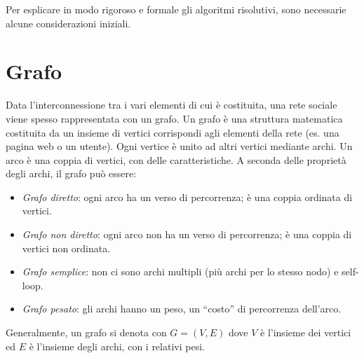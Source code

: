     Per esplicare in modo rigoroso e formale gli algoritmi risolutivi,
    sono necessarie alcune considerazioni iniziali.
    \section{Grafo}
    Data l'interconnessione tra i vari elementi di cui è costituita, una rete sociale viene spesso rappresentata con un grafo.
    Un grafo è una struttura matematica costituita da un insieme di vertici corrispondi agli elementi della rete (es. una pagina web o un utente). 
    Ogni vertice è unito ad altri vertici mediante archi. Un arco è una coppia di vertici, con delle caratteristiche. 
    A seconda delle proprietà degli archi, il grafo può essere:
    \begin{itemize}
        \item \emph{Grafo diretto}: ogni arco ha un verso di percorrenza; è una coppia ordinata di vertici.
        \item \emph{Grafo non diretto}: ogni arco non ha un verso di percorrenza; è una coppia di vertici non ordinata.
        \item \emph{Grafo semplice}: non ci sono archi multipli (più archi per lo stesso nodo) e self-loop.
        \item \emph{Grafo pesato}: gli archi hanno un peso, un ``costo'' di percorrenza dell'arco.
    \end{itemize}
    Generalmente, un grafo si denota con $G=(V,E)$ dove $V$ 
    è l'insieme dei vertici ed $E$ è l'insieme degli archi, con i relativi pesi.

